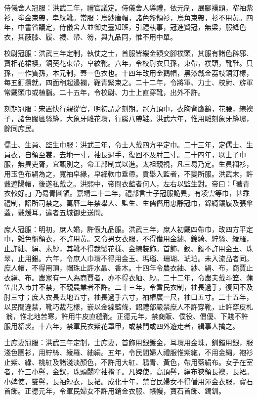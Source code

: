 侍儀舍人冠服：洪武二年，禮官議定。侍儀舍人導禮，依元制，展腳襆頭，窄袖紫衫，塗金束帶，皁紋靴。常服：烏紗唐帽，諸色盤領衫，烏角束帶，衫不用黃。四年，中書省議定，侍儀舍人並御史臺知班，引禮執事，冠進賢冠，無梁，服絳色衣，其蔽膝、履、襪、帶、笏，與九品同，惟不用中單。

校尉冠服：洪武三年定制，執仗之士，首服皆縷金額交腳襆頭，其服有諸色辟邪、寶相花裙襖，銅葵花束帶，皁紋靴。六年，令校尉衣只孫，束帶，襆頭，靴鞋。只孫，一作質孫，本元制，蓋一色衣也。十四年改用金鵝帽，黑漆戧金荔枝銅釘樣，每五釘攢就，四面稍起邊襴，鞓青緊束之。二十二年，令將軍、力士、校尉、旂軍常戴頭巾或榼腦。二十五年，令校尉、力士上直穿靴，出外不許。

刻期冠服：宋置快行親從官，明初謂之刻期。冠方頂巾，衣胸背鷹鷂，花腰，線襖子，諸色闊匾絲絳，大象牙雕花環，行縢八帶鞋。洪武六年，惟用雕刻象牙絳環，餘同庶民。

儒士、生員、監生巾服：洪武三年，令士人戴四方平定巾。二十三年，定儒士、生員衣，自領至裳，去地一寸，袖長過手，復回不及肘三寸。二十四年，以士子巾服，無異吏胥，宜甄別之，命工部制式以進。太祖親視，凡三易乃定。生員襴衫，用玉色布絹為之，寬袖皁緣，皁絳軟巾垂帶。貢舉入監者，不變所服。洪武末，許戴遮陽帽，後遂私戴之。洪熙中，帝問衣藍者何人，左右以監生對。帝曰：「著青衣較好。」乃易青圓領。嘉靖二十二年，禮部言士子冠服詭異，有凌雲等巾，甚乖禮制，詔所司禁之。萬曆二年禁舉人、監生、生儒僭用忠靜冠巾，錦綺鑲履及張傘蓋，戴煖耳，違者五城御史送問。

庶人冠服：明初，庶人婚，許假九品服。洪武三年，庶人初戴四帶巾，改四方平定巾，雜色盤領衣，不許用黃。又令男女衣服，不得僭用金繡、錦綺、紵絲、綾羅，止許紬、絹、素紗，其靴不得裁製花樣、金線裝飾。首飾、釵、鐲不許用金玉、珠翠，止用銀。六年，令庶人巾環不得用金玉、瑪瑙、珊瑚、琥珀。未入流品者同。庶人帽，不得用頂，帽珠止許水晶、香木。十四年令農衣紬、紗、絹、布，商賈止衣絹、布。農家有一人為商賈者，亦不得衣紬、紗。二十二年，令農夫戴斗笠、蒲笠出入市井不禁，不親農業者不許。二十三年，令耆民衣制，袖長過手，復回不及肘三寸；庶人衣長去地五寸，袖長過手六寸，袖樁廣一尺，袖口五寸。二十五年，以民間違禁，靴巧裁花樣，嵌以金線藍條，詔禮部嚴禁庶人不許穿靴，止許穿皮札翁，惟北地苦寒，許用牛皮直縫靴。正德元年，禁商販、僕役、倡優、下賤不許服用貂裘。十六年，禁軍民衣紫花罩甲，或禁門或四外遊走者，緝事人擒之。

士庶妻冠服：洪武三年定制，士庶妻，首飾用銀鍍金，耳環用金珠，釧鐲用銀，服淺色團衫，用紵絲、綾羅、紬絹。五年，令民間婦人禮服惟紫絁，不用金繡，袍衫止紫、綠、桃紅及諸淺淡顏色，不許用大紅、鴉青、黃色，帶用藍絹布。女子在室者，作三小髻，金釵，珠頭閟窄袖褙子。凡婢使，高頂髻，絹布狹領長襖，長裙。小婢使，雙髻，長袖短衣，長裙。成化十年，禁官民婦女不得僭用渾金衣服，寶石首飾。正德元年，令軍民婦女不許用銷金衣服、帳幔，寶石首飾、鐲釧。

